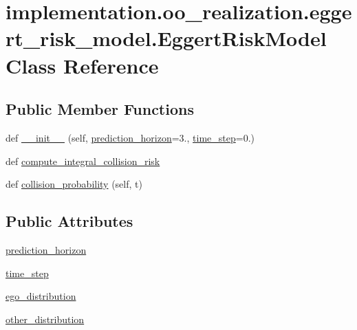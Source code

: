 \hypertarget{classimplementation_1_1oo__realization_1_1eggert__risk__model_1_1_eggert_risk_model}{}\section{implementation.\+oo\+\_\+realization.\+eggert\+\_\+risk\+\_\+model.\+Eggert\+Risk\+Model Class Reference}
\label{classimplementation_1_1oo__realization_1_1eggert__risk__model_1_1_eggert_risk_model}
\subsection*{Public Member Functions}
\begin{DoxyCompactItemize}
\item 
def \hyperlink{classimplementation_1_1oo__realization_1_1eggert__risk__model_1_1_eggert_risk_model_ac12d0b65f7505ec6f3c73aa6f7871f4e}{\+\_\+\+\_\+init\+\_\+\+\_\+} (self, \hyperlink{classimplementation_1_1oo__realization_1_1eggert__risk__model_1_1_eggert_risk_model_ad63c2f415787321362fe345b8aa234a4}{prediction\+\_\+horizon}=3., \hyperlink{classimplementation_1_1oo__realization_1_1eggert__risk__model_1_1_eggert_risk_model_a7264ecf46844adcadaa42493c018e2b4}{time\+\_\+step}=0.)
\item 
def \hyperlink{classimplementation_1_1oo__realization_1_1eggert__risk__model_1_1_eggert_risk_model_a842f4654cc9d0db33e5259ad7408b1de}{compute\+\_\+integral\+\_\+collision\+\_\+risk}
\item 
def \hyperlink{classimplementation_1_1oo__realization_1_1eggert__risk__model_1_1_eggert_risk_model_adbaef5a8dd281663504e34b71d7256c1}{collision\+\_\+probability} (self, t)
\end{DoxyCompactItemize}
\subsection*{Public Attributes}
\begin{DoxyCompactItemize}
\item 
\hyperlink{classimplementation_1_1oo__realization_1_1eggert__risk__model_1_1_eggert_risk_model_ad63c2f415787321362fe345b8aa234a4}{prediction\+\_\+horizon}
\item 
\hyperlink{classimplementation_1_1oo__realization_1_1eggert__risk__model_1_1_eggert_risk_model_a7264ecf46844adcadaa42493c018e2b4}{time\+\_\+step}
\item 
\hyperlink{classimplementation_1_1oo__realization_1_1eggert__risk__model_1_1_eggert_risk_model_a60a8b48fd165a8ac70be6acd3631b483}{ego\+\_\+distribution}
\item 
\hyperlink{classimplementation_1_1oo__realization_1_1eggert__risk__model_1_1_eggert_risk_model_a7712b41ba92d493f1b463b79699a64e1}{other\+\_\+distribution}
\end{DoxyCompactItemize}


